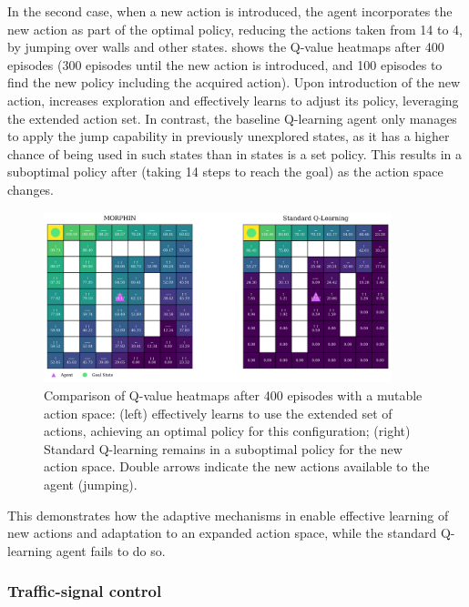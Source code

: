 In the second case, when a new action is introduced, the \adaptiverl agent incorporates the new 
action as part of the optimal policy, reducing the actions taken from 14 to 4, by jumping over walls and 
other states.  shows the Q-value heatmaps after 400 episodes (300 episodes 
until the new action is introduced, and 100 episodes to find  the new policy including the acquired 
action). Upon introduction of the new action, \adaptiverl increases exploration and effectively learns 
to adjust its policy, leveraging the extended action set. In contrast, the baseline Q-learning agent only 
manages to apply the jump capability in previously unexplored states, as it has a higher chance of 
being used in such states than in states is a set policy. This results in a suboptimal policy after (taking 
14 steps to reach the goal) as the action space changes. 

\begin{figure}[hptb]
    \centering
    \includegraphics[width=0.9\textwidth]{figures/q_map_comp2}
    \caption{Comparison of Q-value heatmaps after 400 episodes with a mutable action space: (left) \adaptiverl effectively learns to use the extended set of actions, achieving an optimal policy for this configuration; (right) Standard Q-learning remains in a suboptimal policy for the new action space. Double arrows indicate the new actions available to the agent (jumping).}
    \label{fig:q-value-comp2}
\end{figure}

This demonstrates how the adaptive mechanisms in \adaptiverl enable effective learning of new 
actions and adaptation to an expanded action space, while the standard Q-learning agent fails to do 
so.

\subsubsection{Traffic-signal control}

